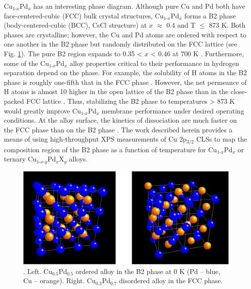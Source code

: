 \documentclass[number, sort&compress, review, 12pt]{elsarticle}
\begin{document}
Cu$_{\text{1-}x}$Pd$_x$ has an interesting phase diagram. Although pure Cu and Pd both have face-centered-cubic (FCC) bulk crystal structures, Cu$_{\text{1-}x}$Pd$_x$ forms a B2 phase (body-centered-cubic (BCC), CsCl structure) at $x$ $\approx$ 0.4 and T $\le$ 873 K. Both phases are crystalline; however, the Cu and Pd atoms are ordered with respect to one another in the B2 phase but randomly distributed on the FCC lattice (see Fig. \ref{fig-struc}). The pure B2 region expands to 0.35 \textless{} $x$ \textless{} 0.46 at 700 K \cite{subramanian-1991-cu-pd-pallad}. Furthermore, some of the Cu$_{\text{1-}x}$Pd$_x$ alloy properties critical to their performance in hydrogen separation depend on the phase. For example, the solubility of H atoms in the B2 phase is roughly one-fifth that in the FCC phase \cite{martin-2013-measur-hydrog}. However, the net permeance of H atoms is almost 10\texttimes{} higher in the open lattice of the B2 phase than in the close-packed FCC lattice \cite{kamakoti-2005-predic-hydrog}. Thus, stabilizing the B2 phase to temperatures \textgreater{} 873 K would greatly improve Cu$_{\text{1-}x}$Pd$_x$ membrane performance under desired operating conditions. At the alloy surface, the kinetics of  dissociation are much faster on the FCC phase than on the B2 phase \cite{obrien-2011-kinet-h}. The work described herein provides a means of using high-throughput XPS measurements of Cu 2p$_{\text{3/2}}$ CLSs to map the composition region of the B2 phase as a function of temperature for Cu$_{\text{1-}x}$Pd$_x$ or ternary Cu$_{\text{1-}x\text{-}y}$Pd$_x$X$_y$ alloys.

\begin{figure}[htb]
\centering
\includegraphics[width=.9\linewidth]{./images/b2-fcc.png}
\caption{.  Left. Cu$_{\text{0.5}}$Pd$_{\text{0.5}}$ ordered alloy in the B2 phase at 0 K (Pd – blue, Cu – orange).  Right. Cu$_{\text{0.3}}$Pd$_{\text{0.7}}$ disordered alloy in the FCC phase. \label{fig-struc}}
\end{figure}
\end{document}
